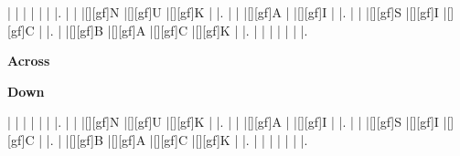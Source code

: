 \documentclass{article}
\begin{document}
\begin{Puzzle}{6}{6}
|{} |{} |{} |{} |{} |{} |. 
|{} |{} |[][gf]N |[][gf]U |[][gf]K |{} |. 
|{} |{} |[][gf]A |{} |[][gf]I |{} |. 
|{} |{} |[][gf]S |[][gf]I |[][gf]C |{} |. 
|{} |[][gf]B |[][gf]A |[][gf]C |[][gf]K |{} |. 
|{} |{} |{} |{} |{} |{} |. 

\end{Puzzle}
\begin{PuzzleClues}{\textbf{Across}}
\end{PuzzleClues}
\begin{PuzzleClues}{\textbf{Down}}
\end{PuzzleClues}
\newpage
\PuzzleSolution
\begin{Puzzle}{6}{6}
|{} |{} |{} |{} |{} |{} |. 
|{} |{} |[][gf]N |[][gf]U |[][gf]K |{} |. 
|{} |{} |[][gf]A |{} |[][gf]I |{} |. 
|{} |{} |[][gf]S |[][gf]I |[][gf]C |{} |. 
|{} |[][gf]B |[][gf]A |[][gf]C |[][gf]K |{} |. 
|{} |{} |{} |{} |{} |{} |. 

\end{Puzzle}
\end{document}
